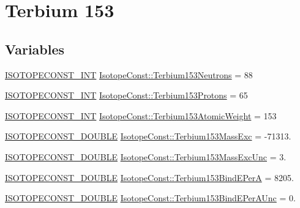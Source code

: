 \hypertarget{group___isotope_const-_terbium-_tb153}{}\section{Terbium 153}
\label{group___isotope_const-_terbium-_tb153}
\subsection*{Variables}
\begin{DoxyCompactItemize}
\item 
\mbox{\hyperlink{group___isotope_const-_macros_ga5f18360b3e99483a35c32d789e62621c}{I\+S\+O\+T\+O\+P\+E\+C\+O\+N\+S\+T\+\_\+\+I\+NT}} \mbox{\hyperlink{group___isotope_const-_terbium-_tb153_ga1f2bad8e3f1b81eeb6d7865c8cabf596}{Isotope\+Const\+::\+Terbium153\+Neutrons}} = 88
\item 
\mbox{\hyperlink{group___isotope_const-_macros_ga5f18360b3e99483a35c32d789e62621c}{I\+S\+O\+T\+O\+P\+E\+C\+O\+N\+S\+T\+\_\+\+I\+NT}} \mbox{\hyperlink{group___isotope_const-_terbium-_tb153_ga0b1a9e585677c825dec688f3c5bd6402}{Isotope\+Const\+::\+Terbium153\+Protons}} = 65
\item 
\mbox{\hyperlink{group___isotope_const-_macros_ga5f18360b3e99483a35c32d789e62621c}{I\+S\+O\+T\+O\+P\+E\+C\+O\+N\+S\+T\+\_\+\+I\+NT}} \mbox{\hyperlink{group___isotope_const-_terbium-_tb153_ga0ff86ecf536c2101d2804f52d1feb8ee}{Isotope\+Const\+::\+Terbium153\+Atomic\+Weight}} = 153
\item 
\mbox{\hyperlink{group___isotope_const-_macros_ga8f45a7272ce02c0b4c65c44636ed719a}{I\+S\+O\+T\+O\+P\+E\+C\+O\+N\+S\+T\+\_\+\+D\+O\+U\+B\+LE}} \mbox{\hyperlink{group___isotope_const-_terbium-_tb153_ga397c663f1af44ec1fc75a04fa238c092}{Isotope\+Const\+::\+Terbium153\+Mass\+Exc}} = -\/71313.
\item 
\mbox{\hyperlink{group___isotope_const-_macros_ga8f45a7272ce02c0b4c65c44636ed719a}{I\+S\+O\+T\+O\+P\+E\+C\+O\+N\+S\+T\+\_\+\+D\+O\+U\+B\+LE}} \mbox{\hyperlink{group___isotope_const-_terbium-_tb153_gacd560cf904de02123cb1c272717abc48}{Isotope\+Const\+::\+Terbium153\+Mass\+Exc\+Unc}} = 3.
\item 
\mbox{\hyperlink{group___isotope_const-_macros_ga8f45a7272ce02c0b4c65c44636ed719a}{I\+S\+O\+T\+O\+P\+E\+C\+O\+N\+S\+T\+\_\+\+D\+O\+U\+B\+LE}} \mbox{\hyperlink{group___isotope_const-_terbium-_tb153_ga969c801944a6962202c2cc4971321431}{Isotope\+Const\+::\+Terbium153\+Bind\+E\+PerA}} = 8205.
\item 
\mbox{\hyperlink{group___isotope_const-_macros_ga8f45a7272ce02c0b4c65c44636ed719a}{I\+S\+O\+T\+O\+P\+E\+C\+O\+N\+S\+T\+\_\+\+D\+O\+U\+B\+LE}} \mbox{\hyperlink{group___isotope_const-_terbium-_tb153_ga32c05fb0b1df26be9cdc9f19d409f18c}{Isotope\+Const\+::\+Terbium153\+Bind\+E\+Per\+A\+Unc}} = 0.

\end{DoxyCompactItemize}
